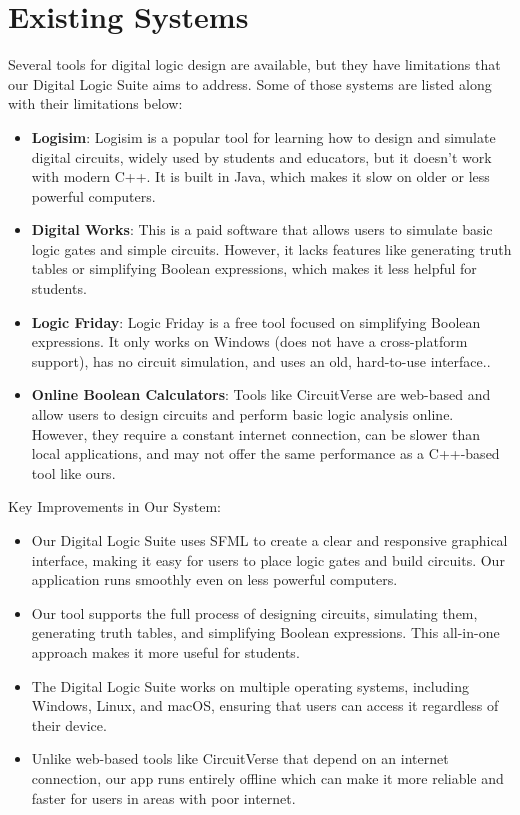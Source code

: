 \section{Existing Systems}
Several tools for digital logic design are available, but they have limitations that our Digital Logic Suite aims to address. Some of those systems are listed along with their limitations below:

\begin{itemize}
    \item \textbf{Logisim}: Logisim is a popular tool for learning how to design and simulate digital circuits, widely used by students and educators, but it doesn't work with modern C++. It is built in Java, which makes it slow on older or less powerful computers.
    \item \textbf{Digital Works}: This is a paid software that allows users to simulate basic logic gates and simple circuits. However, it lacks features like generating truth tables or simplifying Boolean expressions, which makes it less helpful for students.
    \item \textbf{Logic Friday}: Logic Friday is a free tool focused on simplifying Boolean expressions. It only works on Windows (does not have a cross-platform support), has no circuit simulation, and uses an old, hard-to-use interface..
    \item \textbf{Online Boolean Calculators}: Tools like CircuitVerse are web-based and allow users to design circuits and perform basic logic analysis online. However, they require a constant internet connection, can be slower than local applications, and may not offer the same performance as a C++-based tool like ours.
\end{itemize}
\clearpage
Key Improvements in Our System:
\begin{itemize}
    \item Our Digital Logic Suite uses SFML to create a clear and responsive graphical interface, making it easy for users to place logic gates and build circuits. Our application runs smoothly even on less powerful computers.
    \item Our tool supports the full process of designing circuits, simulating them, generating truth tables, and simplifying Boolean expressions. This all-in-one approach makes it more useful for students.
    \item The Digital Logic Suite works on multiple operating systems, including Windows, Linux, and macOS, ensuring that users can access it regardless of their device.
    \item Unlike web-based tools like CircuitVerse that depend on an internet connection, our app runs entirely offline which can make it more reliable and faster for users in areas with poor internet.
\end{itemize}
\clearpage